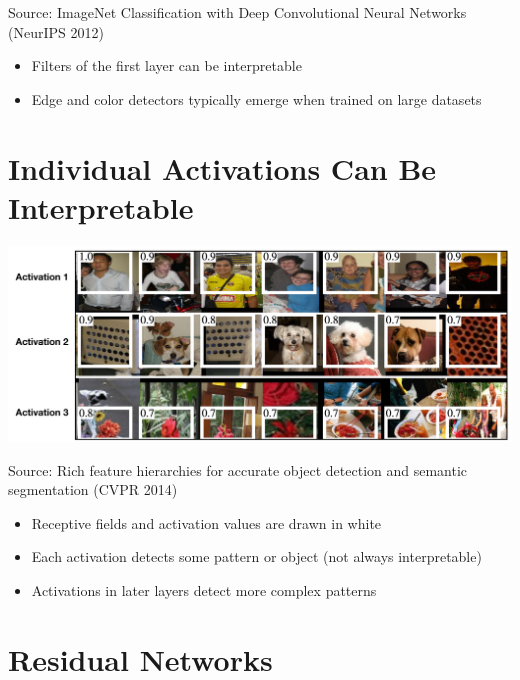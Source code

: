 \documentclass[10pt]{article}
\begin{document}
Source: ImageNet Classification with Deep Convolutional Neural Networks (NeurIPS 2012)

\begin{itemize}
  \item Filters of the first layer can be interpretable

  \item Edge and color detectors typically emerge when trained on large datasets

\end{itemize}

\section*{Individual Activations Can Be Interpretable}
\begin{center}
\includegraphics[max width=\textwidth]{2024_01_08_959e2db67a31f073f6d2g-17}
\end{center}

Source: Rich feature hierarchies for accurate object detection and semantic segmentation (CVPR 2014)

\begin{itemize}
  \item Receptive fields and activation values are drawn in white
  \item Each activation detects some pattern or object (not always interpretable)
  \item Activations in later layers detect more complex patterns
\end{itemize}

\section*{Residual Networks}
\end{document}

